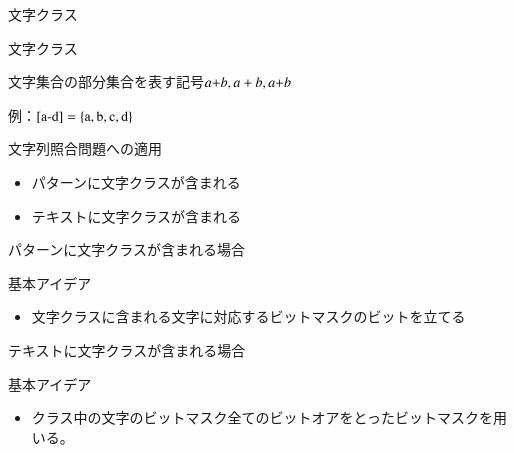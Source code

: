 \documentclass[dvipdfmx,12pt,beamer]{standalone}
\begin{document}
\begin{frame}{文字クラス}
	\begin{block}{文字クラス}
		
		文字集合の部分集合を表す記号$a\mathchar`+b, a+b, a\text{+}b$
		
		例：$[\text{a}\mathchar`-\text{d}] = \{\text{a},\text{b},\text{c},\text{d}\}$
	\end{block}
	\begin{block}{文字列照合問題への適用}
		\begin{itemize}
			\item パターンに文字クラスが含まれる
			\item テキストに文字クラスが含まれる
		\end{itemize}
	\end{block}
\end{frame}
\begin{frame}{パターンに文字クラスが含まれる場合}
	\begin{block}{基本アイデア}
		\begin{itemize}
			\item 文字クラスに含まれる文字に対応するビットマスクのビットを立てる
		\end{itemize}
	\end{block}
\end{frame}
\begin{frame}{テキストに文字クラスが含まれる場合}
	\begin{block}{基本アイデア}	
		\begin{itemize}
			\item クラス中の文字のビットマスク全てのビットオアをとったビットマスクを用いる。
		\end{itemize}
	\end{block}
\end{frame}
\end{document}
